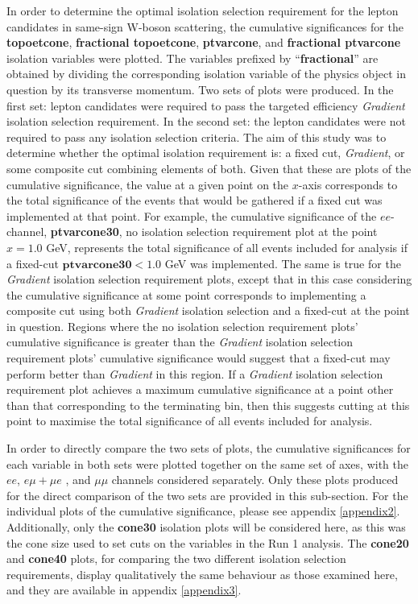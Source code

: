  In order to determine the optimal isolation selection requirement for the lepton candidates in same-sign W-boson scattering, the cumulative significances for the \textbf{topoetcone}, \textbf{fractional topoetcone}, \textbf{ptvarcone}, and \textbf{fractional ptvarcone} isolation variables were plotted. The variables prefixed by ``\textbf{fractional}'' are obtained by dividing the corresponding isolation variable of the physics object in question by its transverse momentum. Two sets of plots were produced. In the first set: lepton candidates were required to pass the targeted efficiency \textit{Gradient} isolation selection requirement. In the second set: the lepton candidates were not required to pass any isolation selection criteria. The aim of this study was to determine whether the optimal isolation requirement is: a fixed cut, \textit{Gradient}, or some composite cut combining elements of both. Given that these are plots of the cumulative significance, the value at a given point on the $x$-axis corresponds to the total significance of the events that would be gathered if a fixed cut was implemented at that point. For example, the cumulative significance of the $ee$-channel, \textbf{ptvarcone30}, no isolation selection requirement plot at the point $x = 1.0$ GeV, represents the total significance of all events included for analysis if a fixed-cut $\mathbf{ptvarcone30} < 1.0$ GeV was implemented. The same is true for the \textit{Gradient} isolation selection requirement plots, except that in this case considering the cumulative significance at some point corresponds to implementing a composite cut using both \textit{Gradient} isolation selection and a fixed-cut at the point in question. Regions where the no isolation selection requirement plots' cumulative significance is greater than the \textit{Gradient} isolation selection requirement plots' cumulative significance would suggest that a fixed-cut may perform better than \textit{Gradient} in this region. If a \textit{Gradient} isolation selection requirement plot achieves a maximum cumulative significance at a point other than that corresponding to the terminating bin, then this suggests cutting at this point to maximise the total significance of all events included for analysis.

In order to directly compare the two sets of plots, the cumulative significances for each variable in both sets were plotted together on the same set of axes, with the $ee$, $e\mu + \mu e$ , and $\mu\mu$ channels considered separately.  Only these plots produced for the direct comparison of the two sets are provided in this sub-section. For the individual plots of the cumulative significance, please see appendix \ref{appendix2}. Additionally, only the \textbf{cone30} isolation plots will be considered here, as this was the cone size used to set cuts on the variables in the Run 1 analysis. The \textbf{cone20} and \textbf{cone40} plots, for comparing the two different isolation selection requirements, display qualitatively the same behaviour as those examined here, and they are available in appendix \ref{appendix3}.

